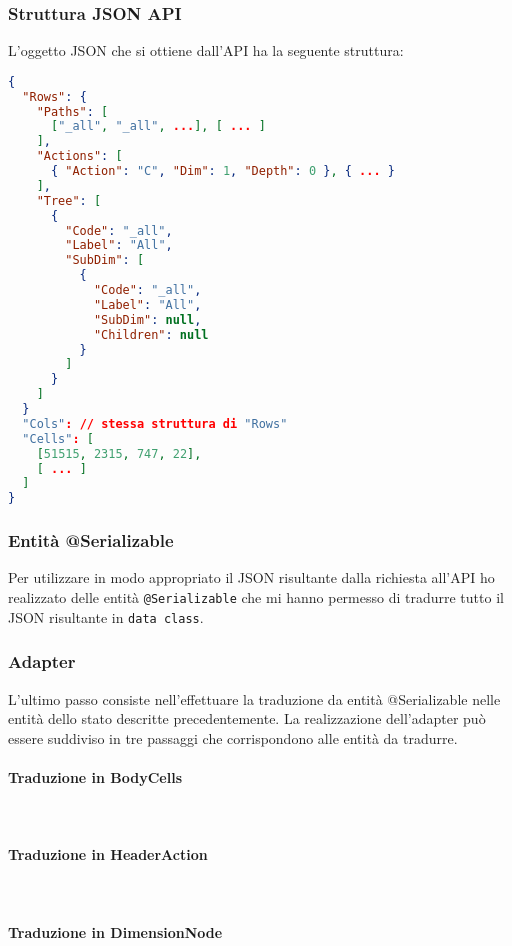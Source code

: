 \subsubsection{Struttura JSON API}
L'oggetto JSON che si ottiene dall'API ha la seguente struttura:
\begin{lstlisting}[caption={BodyCells}, label={lst:bodycells}, language=json]
{
  "Rows": {
  	"Paths": [
  	  ["_all", "_all", ...], [ ... ]
  	],
  	"Actions": [
  	  { "Action": "C", "Dim": 1, "Depth": 0 }, { ... }
  	],
  	"Tree": [
  	  {
  	    "Code": "_all",
  	    "Label": "All",
  	    "SubDim": [
  	      {
  	        "Code": "_all",
  	        "Label": "All",
  	        "SubDim": null,
  	        "Children": null
  	      }
  	    ]  
  	  }
  	]
  }
  "Cols": // stessa struttura di "Rows"
  "Cells": [
    [51515, 2315, 747, 22],
    [ ... ]
  ]
}
\end{lstlisting}

\subsubsection{Entità @Serializable}
Per utilizzare in modo appropriato il JSON risultante dalla richiesta all'API ho realizzato delle entità \verb|@Serializable| che mi hanno permesso di tradurre tutto il JSON risultante in \verb|data class|.

\subsubsection{Adapter}
L'ultimo passo consiste nell'effettuare la traduzione da entità @Serializable nelle entità dello stato descritte precedentemente. La realizzazione dell'adapter può essere suddiviso in tre passaggi che corrispondono alle entità da tradurre.

\paragraph{Traduzione in BodyCells}\mbox{} \\


\paragraph{Traduzione in HeaderAction}\mbox{} \\


\paragraph{Traduzione in DimensionNode}\mbox{} \\


